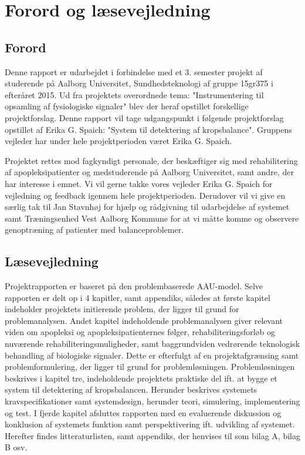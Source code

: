 \chapter*{Forord og læsevejledning}
\section{Forord}
Denne rapport er udarbejdet i forbindelse med et 3. semester projekt af studerende på Aalborg Universitet,  Sundhedsteknologi af gruppe 15gr375 i efteråret 2015. Ud fra projektets overordnede tema: "Instrumentering til opsamling af fysiologiske signaler" blev der heraf opstillet forskellige projektforslag. Denne rapport vil tage udgangspunkt i følgende projektforslag opstillet af Erika G. Spaich: "System til detektering af kropsbalance". Gruppens vejleder har under hele projektperioden været Erika G. Spaich.

Projektet rettes mod fagkyndigt personale, der beskæftiger sig med rehabilitering af apopleksipatienter og medstuderende på Aalborg Universitet, samt andre, der har interesse i emnet. 
Vi vil gerne takke vores vejleder Erika G. Spaich for vejledning og feedback igennem hele projektperioden. Derudover vil vi give en særlig tak til Jan Stavnhøj for hjælp og rådgivning til udarbejdelse af systemet samt Træningsenhed Vest Aalborg Kommune for at vi måtte komme og observere genoptræning af patienter med balanceproblemer. 

\section{Læsevejledning}
Projektrapporten er baseret på den problembaserede AAU-model. Selve rapporten er delt op i 4 kapitler, samt appendiks, således at første kapitel indeholder projektets initierende problem, der ligger til grund for problemanalysen. Andet kapitel indeholdende problemanalysen giver relevant viden om apopleksi og apopleksipatienternes følger, rehabiliteringsforløb og nuværende rehabiliteringsmuligheder, samt baggrundviden vedrørende teknologisk behandling af biologiske signaler.  Dette er efterfulgt af en projektafgrænsing samt problemformulering, der ligger til grund for problemløsningen. Problemløsningen beskrives i kapitel tre, indeholdende projektets praktiske del ift. at bygge et system til detektering af kropsbalancen. Herunder beskrives systemets kravspecifikationer samt systemdesign, herunder teori, simulering, implementering og test. I fjerde kapitel afsluttes rapporten med en evaluerende diskussion og konklusion af systemets funktion samt perspektivering ift. udvikling af systemet. Herefter findes litteraturlisten, samt appendiks, der henvises til som bilag A, bilag B osv. 

